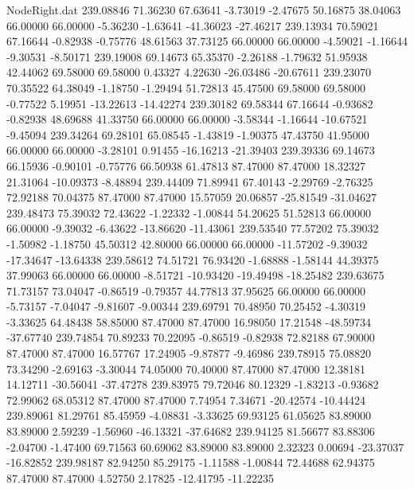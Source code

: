 \begin{filecontents}{NodeRight.dat}
 239.08846   71.36230   67.63641    -3.73019   -2.47675   50.16875   38.04063   66.00000   66.00000   -5.36230   -1.63641  -41.36023  -27.46217
 239.13934   70.59021   67.16644    -0.82938   -0.75776   48.61563   37.73125   66.00000   66.00000   -4.59021   -1.16644   -9.30531   -8.50171
 239.19008   69.14673   65.35370    -2.26188   -1.79632   51.95938   42.44062   69.58000   69.58000    0.43327    4.22630  -26.03486  -20.67611
 239.23070   70.35522   64.38049    -1.18750   -1.29494   51.72813   45.47500   69.58000   69.58000   -0.77522    5.19951  -13.22613  -14.42274
 239.30182   69.58344   67.16644    -0.93682   -0.82938   48.69688   41.33750   66.00000   66.00000   -3.58344   -1.16644  -10.67521   -9.45094
 239.34264   69.28101   65.08545    -1.43819   -1.90375   47.43750   41.95000   66.00000   66.00000   -3.28101    0.91455  -16.16213  -21.39403
 239.39336   69.14673   66.15936    -0.90101   -0.75776   66.50938   61.47813   87.47000   87.47000   18.32327   21.31064  -10.09373   -8.48894
 239.44409   71.89941   67.40143    -2.29769   -2.76325   72.92188   70.04375   87.47000   87.47000   15.57059   20.06857  -25.81549  -31.04627
 239.48473   75.39032   72.43622    -1.22332   -1.00844   54.20625   51.52813   66.00000   66.00000   -9.39032   -6.43622  -13.86620  -11.43061
 239.53540   77.57202   75.39032    -1.50982   -1.18750   45.50312   42.80000   66.00000   66.00000  -11.57202   -9.39032  -17.34647  -13.64338
 239.58612   74.51721   76.93420    -1.68888   -1.58144   44.39375   37.99063   66.00000   66.00000   -8.51721  -10.93420  -19.49498  -18.25482
 239.63675   71.73157   73.04047    -0.86519   -0.79357   44.77813   37.95625   66.00000   66.00000   -5.73157   -7.04047   -9.81607   -9.00344
 239.69791   70.48950   70.25452    -4.30319   -3.33625   64.48438   58.85000   87.47000   87.47000   16.98050   17.21548  -48.59734  -37.67740
 239.74854   70.89233   70.22095    -0.86519   -0.82938   72.82188   67.90000   87.47000   87.47000   16.57767   17.24905   -9.87877   -9.46986
 239.78915   75.08820   73.34290    -2.69163   -3.30044   74.05000   70.40000   87.47000   87.47000   12.38181   14.12711  -30.56041  -37.47278
 239.83975   79.72046   80.12329    -1.83213   -0.93682   72.99062   68.05312   87.47000   87.47000    7.74954    7.34671  -20.42574  -10.44424
 239.89061   81.29761   85.45959    -4.08831   -3.33625   69.93125   61.05625   83.89000   83.89000    2.59239   -1.56960  -46.13321  -37.64682
 239.94125   81.56677   83.88306    -2.04700   -1.47400   69.71563   60.69062   83.89000   83.89000    2.32323    0.00694  -23.37037  -16.82852
 239.98187   82.94250   85.29175    -1.11588   -1.00844   72.44688   62.94375   87.47000   87.47000    4.52750    2.17825  -12.41795  -11.22235

\end{filecontents}
